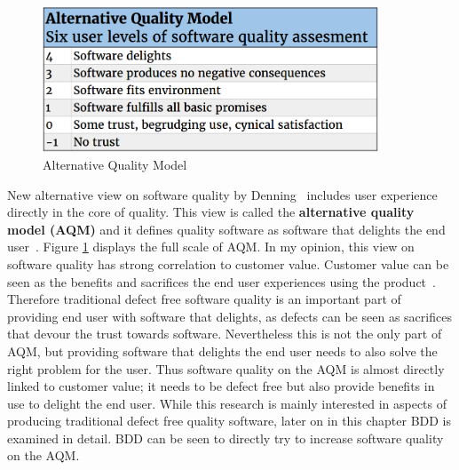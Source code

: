     \begin{figure}[ht]
      \begin{center}
        \includegraphics[width=10cm]{images/alternativeQM.png}
        \caption{Alternative Quality Model}
        \label{fig:AQM}
      \end{center}
    \end{figure}

    New alternative view on software quality by Denning~\cite{denning2016sq} includes user experience directly in the core of quality.
    This view is called the \textbf{alternative quality model (AQM)} and it defines quality software as software that delights
    the end user~\cite{denning2016sq}. Figure \ref{fig:AQM} displays the full scale of AQM.
    In my opinion, this view on software quality has strong correlation to customer value. Customer value can be seen as
    the benefits and sacrifices the end user experiences using the product~\cite{woodruff1997customer}. Therefore traditional
    defect free software quality is an important part of providing end user with software that delights, as defects
    can be seen as sacrifices that devour the trust towards software. Nevertheless this is not the only part of AQM,
    but providing software that delights the end user needs to also solve the right problem for the user.
    Thus software quality on the AQM is almost directly linked to customer value; it needs to be defect free but also
    provide benefits in use to delight the end user. While this research is mainly interested in aspects of producing traditional defect free quality software,
    later on in this chapter BDD is examined in detail. BDD can be seen to directly try to increase software quality on the AQM.

